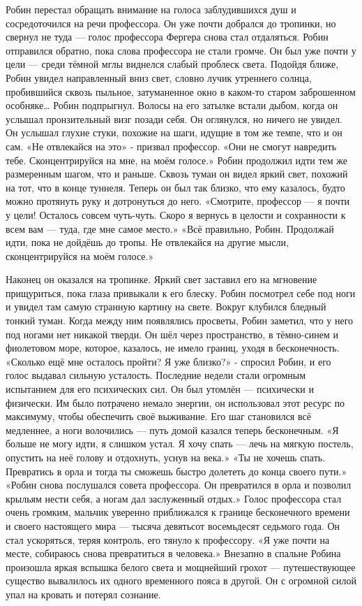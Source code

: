 \documentclass[a4paper,12pt]{book}
\begin{document}
	Робин перестал обращать внимание на голоса заблудившихся душ и сосредоточился на речи профессора. Он уже почти добрался до тропинки, но свернул не туда — голос профессора Фергера снова стал отдаляться. Робин отправился обратно, пока слова профессора не стали громче. Он был уже почти у цели — среди тёмной мглы виднелся слабый проблеск света. Подойдя ближе, Робин увидел направленный вниз свет, словно лучик утреннего солнца, пробившийся сквозь пыльное, затуманенное окно в каком-то старом заброшенном особняке…
	Робин подпрыгнул. Волосы на его затылке встали дыбом, когда он услышал пронзительный визг позади себя. Он оглянулся, но ничего не увидел. Он услышал глухие стуки, похожие на шаги, идущие в том же темпе, что и он сам.
	«Не отвлекайся на это» - призвал профессор.
	«Они не смогут навредить тебе. Сконцентрируйся на мне, на моём голосе.»
	Робин продолжил идти тем же размеренным шагом, что и раньше. Сквозь туман он видел яркий свет, похожий на тот, что в конце туннеля. Теперь он был так близко, что ему казалось, будто можно протянуть руку и дотронуться до него.
	«Смотрите, профессор — я почти у цели! Осталось совсем чуть-чуть. Скоро я вернусь в целости и сохранности к всем вам — туда, где мне самое место.»
	«Всё правильно, Робин. Продолжай идти, пока не дойдёшь до тропы. Не отвлекайся на другие мысли, сконцентрируйся на моём голосе.»

	Наконец он оказался на тропинке. Яркий свет заставил его на мгновение прищуриться, пока глаза привыкали к его блеску. Робин посмотрел себе под ноги и увидел там самую странную картину на свете. Вокруг клубился бледный тонкий туман. Когда между ним появлялись просветы, Робин заметил, что у него под ногами нет никакой тверди. Он шёл через пространство, в тёмно-синем и фиолетовом море, которое, казалось, не имело границ, уходя в бесконечность.
	«Сколько ещё мне осталось пройти? Я уже близко?» - спросил Робин, и его голос выдавал сильную усталость.
	Последние недели стали огромным испытанием для его психических сил. Он был утомлён — психически и физически. Им было потрачено немало энергии, он использовал этот ресурс по максимуму, чтобы обеспечить своё выживание. Его шаг становился всё медленнее, а ноги волочились — путь домой казался теперь бесконечным.
	«Я больше не могу идти, я слишком устал. Я хочу спать — лечь на мягкую постель, опустить на неё голову и отдохнуть, уснув на века.»
	«Ты не хочешь спать. Превратись в орла и тогда ты сможешь быстро долететь до конца своего пути.» 
	«Робин снова послушался совета профессора. Он превратился в орла и позволил крыльям нести себя, а ногам дал заслуженный отдых.»
	Голос профессора стал очень громким, мальчик уверенно приближался к границе бесконечного времени и своего настоящего мира — тысяча девятьсот восемьдесят седьмого года. Он стал ускоряться, теряя контроль, его тянуло к профессору.
	«Я уже почти на месте, собираюсь снова превратиться в человека.»
	Внезапно в спальне Робина произошла яркая вспышка белого света и мощнейший грохот — путешествующее существо вывалилось их одного временного пояса в другой. Он с огромной силой упал на кровать и потерял сознание.
\end{document}
